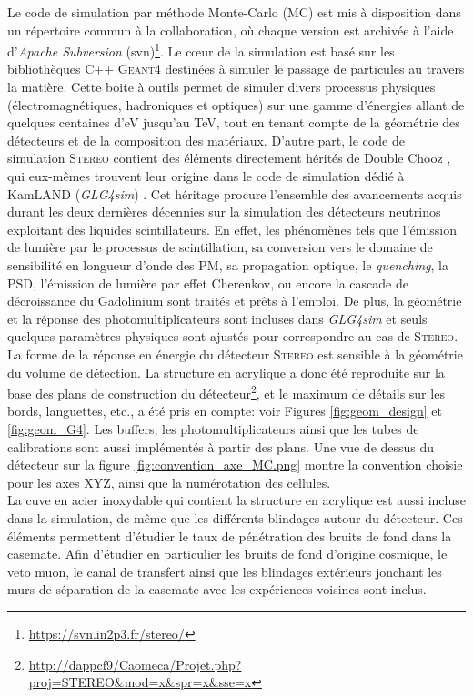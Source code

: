 Le code de simulation par méthode Monte-Carlo (MC) est mis à disposition dans un répertoire commun à la collaboration, où chaque version est archivée à l'aide d'\textit{Apache Subversion} (svn)\footnote{\url{https://svn.in2p3.fr/stereo/}}. Le c\oe ur de la simulation est basé sur les bibliothèques C++ \textsc{Geant4} \cite{Agostinelli:2002hh} destinées à simuler le passage de particules au travers la matière. Cette boite à outils permet de simuler divers processus physiques (électromagnétiques, hadroniques et optiques) sur une gamme d'énergies allant de quelques centaines d'eV jusqu'au TeV, tout en tenant compte de la géométrie des détecteurs et de la composition des matériaux. D'autre part, le code de simulation \textsc{Stereo} contient des éléments directement hérités de Double Chooz \cite{Abe:2014bwa}, qui eux-mêmes trouvent leur origine dans le code de simulation dédié à KamLAND (\textit{GLG4sim}) \cite{Smith:2005}. Cet héritage procure l'ensemble des avancements acquis durant les deux dernières décennies sur la simulation des détecteurs neutrinos exploitant des liquides scintillateurs. En effet, les phénomènes tels que l'émission de lumière par le processus de scintillation, sa conversion vers le domaine de sensibilité en longueur d'onde des PM, sa propagation optique, le \textit{quenching}, la PSD, l'émission de lumière par effet Cherenkov, ou encore la cascade de décroissance du Gadolinium sont traités et prêts à l'emploi. De plus, la géométrie et la réponse des photomultiplicateurs sont incluses dans \textit{GLG4sim} et seuls quelques paramètres physiques sont ajustés pour correspondre au cas de \textsc{Stereo}.\\

La forme de la réponse en énergie du détecteur \textsc{Stereo} est sensible à la géométrie du volume de détection. La structure en acrylique a donc été reproduite sur la base des plans de construction du détecteur\footnote{\url{http://dappcf9/Caomeca/Projet.php?proj=STEREO&mod=x&spr=x&sse=x}}, et le maximum de détails sur les bords, languettes, etc., a été pris en compte: voir Figures \ref{fig:geom_design} et \ref{fig:geom_G4}. Les buffers, les photomultiplicateurs ainsi que les tubes de calibrations sont aussi implémentés à partir des plans. Une vue de dessus du détecteur sur la figure \ref{fig:convention_axe_MC.png} montre la convention choisie pour les axes XYZ, ainsi que la numérotation des cellules.\\

La cuve en acier inoxydable qui contient la structure en acrylique est aussi incluse dans la simulation, de même que les différents blindages autour du détecteur. Ces éléments permettent d'étudier le taux de pénétration des bruits de fond dans la casemate. Afin d'étudier en particulier les bruits de fond d'origine cosmique, le veto muon, le canal de transfert ainsi que les blindages extérieurs jonchant les murs de séparation de la casemate avec les expériences voisines sont inclus.\\

